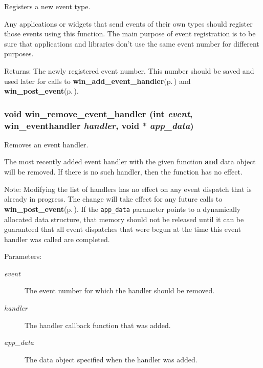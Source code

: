 Registers a new event type. 

Any applications or widgets that send events of their own types should register those events using this function. The main purpose of event registration is to be sure that applications and libraries don't use the same event number for different purposes.

\begin{Desc}
\item[Returns:]The newly registered event number. This number should be saved and used later for calls to {\bf win\_\-add\_\-event\_\-handler}{\rm (p.\,\pageref{winevent_8h_a5})} and {\bf win\_\-post\_\-event}{\rm (p.\,\pageref{winevent_8h_a4})}. \end{Desc}
\subsubsection{\setlength{\rightskip}{0pt plus 5cm}void win\_\-remove\_\-event\_\-handler (int {\em event}, {\bf win\_\-eventhandler} {\em handler}, void $\ast$ {\em app\_\-data})}\label{winevent_8h_a6}


Removes an event handler. 

The most recently added event handler with the given function {\bf and} data object will be removed. If there is no such handler, then the function has no effect.

\begin{Desc}
\item[Note:]Modifying the list of handlers has no effect on any event dispatch that is already in progress. The change will take effect for any future calls to {\bf win\_\-post\_\-event}{\rm (p.\,\pageref{winevent_8h_a4})}. If the {\tt app\_\-data} parameter points to a dynamically allocated data structure, that memory should not be released until it can be guaranteed that all event dispatches that were begun at the time this event handler was called are completed.\end{Desc}
\begin{Desc}
\item[Parameters:]
\begin{description}
\item[{\em event}]The event number for which the handler should be removed. \item[{\em handler}]The handler callback function that was added. \item[{\em app\_\-data}]The data object specified when the handler was added. \end{description}
\end{Desc}
